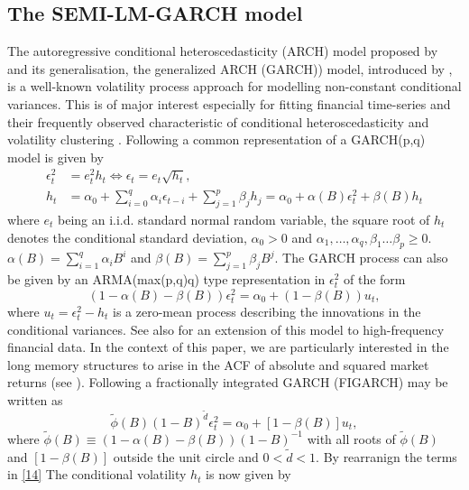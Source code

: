 \documentclass[12pt]{article}
\begin{document}
\subsection{The SEMI-LM-GARCH model}
The autoregressive conditional heteroscedasticity (ARCH) model proposed by \citet{engle1982autoregressive} and its generalisation, the generalized ARCH (GARCH)) model, introduced by \citet{bollerslev1986generalized} , is a well-known volatility process approach for modelling non-constant conditional variances. This is of major interest especially for  fitting financial time-series and their frequently observed characteristic of conditional heteroscedasticity and volatility clustering \citep{mandelbrot1963new}. Following  \citet{baillie1996fractionally} a common representation of a GARCH(p,q) model is given by
\begin{align}
	\epsilon_t^2&=e^2_th_t\iff\epsilon_t=e_t\sqrt{h_t}, \\
	h_t&=\alpha_0+\sum_{i=0}^{q}\alpha_i\epsilon_{t-i}+\sum_{j=1}^{p}\beta_jh_j=\alpha_0+\alpha(B)\epsilon_t^2+\beta(B)h_t
\end{align}
where $e_t$ being an i.i.d. standard normal random variable, the square root of $h_t$ denotes the conditional standard deviation, $\alpha_0>0$ and $\alpha_1,\dots,\alpha_q,\beta_1\dots\beta_p\geq0$. $\alpha(B)=\sum_{i=1}^{q}\alpha_iB^i$ and $\beta(B)=\sum_{j=1}^{p}\beta_jB^j$. The GARCH process can also be given by an ARMA(max(p,q)q) type representation in $\epsilon_t^2$ of the form
\begin{equation}
\label{10}
(1-\alpha(B)-\beta(B))\epsilon^2_t=\alpha_0+(1-\beta(B))u_t,	
\end{equation}
where $u_t=\epsilon^2_t-h_t$ is a zero-mean process describing the innovations in the conditional variances. See also \citet{feng2008modelling} for an extension of this model to high-frequency financial data. In the context of this paper, we are particularly interested in the long memory structures to arise in the ACF of absolute and squared market returns (see \cite{ding1993long}). Following \citet{baillie1996fractionally} a fractionally integrated GARCH (FIGARCH) may be written as
\begin{equation}
\label{14}
\tilde{\phi}(B)(1-B)^{\tilde{d}}\epsilon_t^2=\alpha_0+[1-\beta(B)]u_t,
\end{equation}
where $\tilde{\phi}(B)\equiv (1-\alpha(B)-\beta(B))(1-B)^{-1}$ with all roots of $\tilde{\phi}(B)$ and $[1-\beta(B)]$ outside the unit circle and $0<\tilde{d}<1$. By rearranign the terms in \eqref{14} The conditional volatility $h_t$ is now given by
\end{document}
